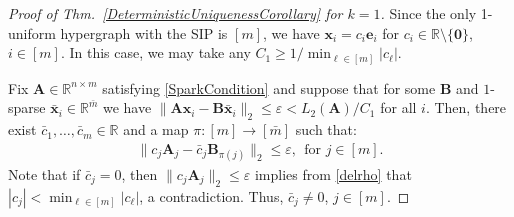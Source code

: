 \documentclass[9pt,twocolumn]{pnas-new}
\begin{document}

\begin{proof}[Proof of Thm.~\ref{DeterministicUniquenessCorollary} for $k=1$]
Since the only 1-uniform hypergraph with the SIP is $[m]$, we have $\mathbf{x}_i = c_i \mathbf{e}_i$ for $c_i \in \mathbb{R} \setminus \{\mathbf{0}\}$, $i \in [m]$. In this case, we may take any $C_1 \geq 1/ \min_{\ell \in [m]} |c_{\ell}|$. 

Fix $\mathbf{A} \in \mathbb{R}^{n \times m}$ satisfying \eqref{SparkCondition} and suppose that for some $\mathbf{B}$ and $1$-sparse $\mathbf{\bar x}_i \in \mathbb{R}^{\bar m}$ we have  $\|\mathbf{A}\mathbf{x}_i - \mathbf{B}\mathbf{\bar x}_i\|_2 \leq \varepsilon < L_2(\mathbf{A}) / C_1$ for all $i$. Then, there exist $\bar{c}_1, \ldots, \bar{c}_m \in \mathbb{R}$ and a map $\pi: [m] \to [\bar m]$ such that:
\begin{align}\label{1D}
\|c_j\mathbf{A}_j - \bar{c}_j\mathbf{B}_{\pi(j)}\|_2 \leq \varepsilon,\ \ \text{for $j \in [m]$}.
\end{align} 
Note that if $\bar{c}_j = 0$, then $\|c_j\mathbf{A}_j \|_2 \leq \varepsilon$ implies from \eqref{delrho} that $|c_j| < \min_{\ell \in [m]} | c_\ell |$, a contradiction.  Thus, $\bar{c}_j \neq 0$, $j \in [m]$.


\end{proof}
\end{document}
